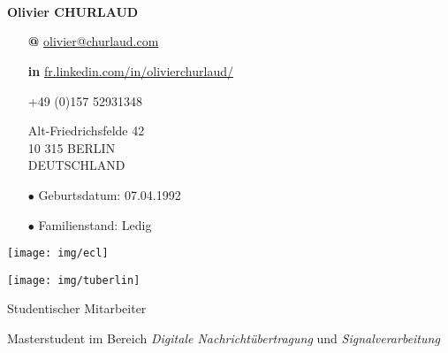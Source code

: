 \documentclass[skip,a4paper]{article}
\begin{document}
\fontsize{8.5}{9.5}
\selectfont

\begin{minipage}[c]{\linewidth}
	\begin{minipage}[c][4cm]{2.6cm}
		~\\~\\
		\vfill
		~
	\end{minipage}
	\begin{minipage}[c][4cm]{5.5cm}
		\textbf{Olivier CHURLAUD}

		\begin{itemize}[itemsep=0.5ex,leftmargin=3ex]
			\footnotesize
			\item[\bfseries @] \url{olivier@churlaud.com}
			\item[\bfseries \color{blue} in] {\scriptsize\url{ fr.linkedin.com/in/olivierchurlaud/}}
			\item[\Telefon]+49 (0)157 52931348
			\item[\Letter] Alt-Friedrichsfelde 42 \\
			10 315 BERLIN \\ 
			DEUTSCHLAND
			\item[$\bullet$] Geburtsdatum: 07.04.1992
			\itemsep -2pt
			\item[$\bullet$] Familienstand: Ledig

		\end{itemize}
	\end{minipage}
	\begin{minipage}[c][4cm]{10cm}
		\begin{minipage}[c]{7.10cm}
			\texttt{[image: img/ecl]}
		\end{minipage}
		\hfill
		\begin{minipage}[c]{2.5cm}
			\texttt{[image: img/tuberlin]}
		\end{minipage}
		
		\vfill
		
		\centering
		{
			\setlength{\parskip}{10pt plus 1pt minus 1pt}
			{\LARGE Studentischer Mitarbeiter}
			
			{\large Masterstudent im Bereich \textit{Digitale Nachrichtübertragung} und \textit{Signalverarbeitung}}
		}
	\end{minipage}
\end{minipage}
\end{document}
